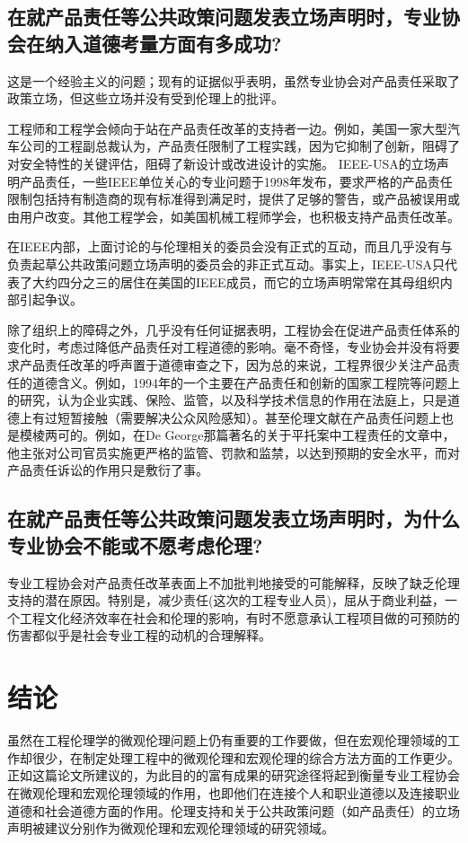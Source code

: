 \documentclass[lang=cn,11pt,a4paper]{elegantpaper}
\begin{document}
\subsection{在就产品责任等公共政策问题发表立场声明时，专业协会在纳入道德考量方面有多成功?}
这是一个经验主义的问题；现有的证据似乎表明，虽然专业协会对产品责任采取了政策立场，但这些立场并没有受到伦理上的批评。

工程师和工程学会倾向于站在产品责任改革的支持者一边。例如，美国一家大型汽车公司的工程副总裁认为，产品责任限制了工程实践，因为它抑制了创新，阻碍了对安全特性的关键评估，阻碍了新设计或改进设计的实施。\cite{24} IEEE-USA的立场声明产品责任，一些IEEE单位关心的专业问题\cite{25}于1998年发布，要求严格的产品责任限制包括持有制造商的现有标准得到满足时，提供了足够的警告，或产品被误用或由用户改变。其他工程学会，如美国机械工程师学会\cite{26}，也积极支持产品责任改革。

在IEEE内部，上面讨论的与伦理相关的委员会没有正式的互动，而且几乎没有与负责起草公共政策问题立场声明的委员会的非正式互动。事实上，IEEE-USA只代表了大约四分之三的居住在美国的IEEE成员，而它的立场声明常常在其母组织内部引起争议。

除了组织上的障碍之外，几乎没有任何证据表明，工程协会在促进产品责任体系的变化时，考虑过降低产品责任对工程道德的影响。毫不奇怪，专业协会并没有将要求产品责任改革的呼声置于道德审查之下，因为总的来说，工程界很少关注产品责任的道德含义。例如，1994年的一个主要在产品责任和创新的国家工程院等问题上的研究\cite{24}，认为企业实践、保险、监管，以及科学技术信息的作用在法庭上，只是道德上有过短暂接触（需要解决公众风险感知）\cite{27}。甚至伦理文献在产品责任问题上也是模棱两可的。\cite{28}例如，在De George那篇著名的关于平托案中工程责任的文章中\cite{29}，他主张对公司官员实施更严格的监管、罚款和监禁，以达到预期的安全水平，而对产品责任诉讼的作用只是敷衍了事。

\subsection{在就产品责任等公共政策问题发表立场声明时，为什么专业协会不能或不愿考虑伦理?}
专业工程协会对产品责任改革表面上不加批判地接受的可能解释，反映了缺乏伦理支持的潜在原因。特别是，减少责任(这次的工程专业人员)，屈从于商业利益，一个工程文化经济效率在社会和伦理的影响，有时不愿意承认工程项目做的可预防的伤害都似乎是社会专业工程的动机的合理解释。

\section{结论}
虽然在工程伦理学的微观伦理问题上仍有重要的工作要做，但在宏观伦理领域的工作却很少，在制定处理工程中的微观伦理和宏观伦理的综合方法方面的工作更少。正如这篇论文所建议的，为此目的的富有成果的研究途径将起到衡量专业工程协会在微观伦理和宏观伦理领域的作用，也即他们在连接个人和职业道德以及连接职业道德和社会道德方面的作用。伦理支持和关于公共政策问题（如产品责任）的立场声明被建议分别作为微观伦理和宏观伦理领域的研究领域。
\end{document}
